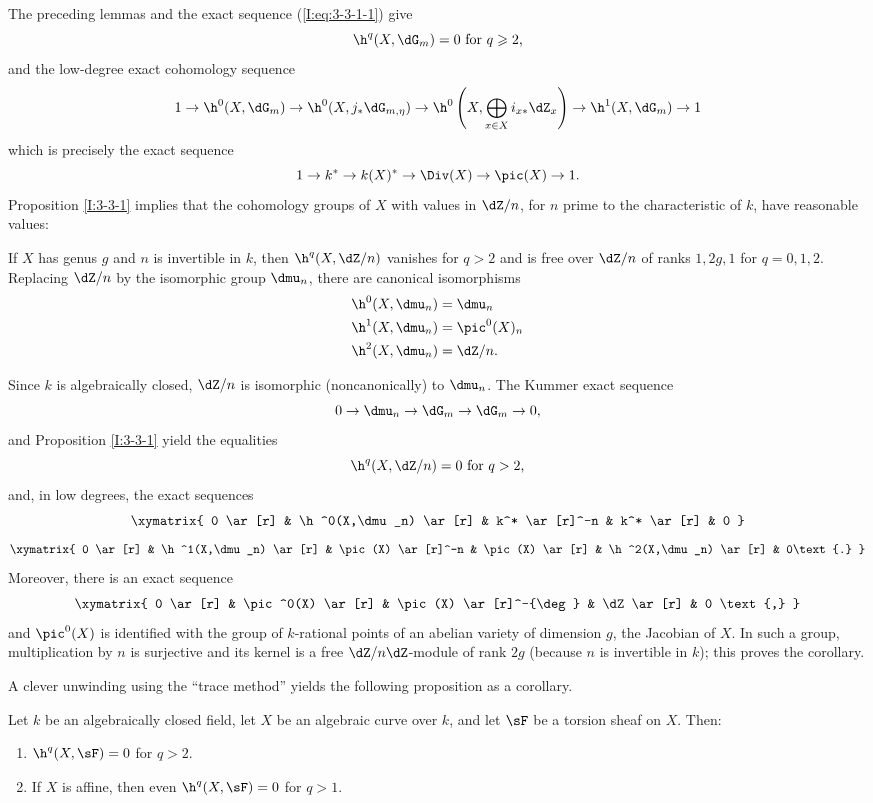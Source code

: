 The preceding lemmas and the exact sequence (\ref{I:eq:3-3-1-1}) give
\[
  \h^q(X,\dG_m) = 0 \text{ for $q\geqslant 2$,}
\]
and the low-degree exact cohomology sequence
\[
  1 \to \h^0(X,\dG_m) \to \h^0(X, j_*\dG_{m,\eta}) \to \h^0\left(X,\bigoplus_{x\in X} i_{x*}\dZ_x\right) \to \h^1(X,\dG_m) \to 1
\]
which is precisely the exact sequence
\[
  1 \to k^* \to k(X)^*\to \Div(X) \to \pic(X) \to 1\text{.}
\]
Proposition \ref{I:3-3-1} implies that the cohomology groups of $X$ with
values in $\dZ/n$, for $n$ prime to the characteristic of $k$, have
reasonable values:

\begin{corollary}\label{I:3-3-5}
If $X$ has genus $g$ and $n$ is invertible in $k$, then
$\h^q(X,\dZ/n)$ vanishes for $q>2$ and is free over $\dZ/n$ of ranks
$1,2g,1$ for $q=0,1,2$. Replacing $\dZ/n$ by the isomorphic group
$\dmu_n$, there are canonical isomorphisms
\begin{align*}
  \h^0(X,\dmu_n) &= \dmu_n \\
  \h^1(X,\dmu_n) &= \pic^0(X)_n \\
  \h^2(X,\dmu_n) &= \dZ/n \text{.}
\end{align*}
\end{corollary}

Since $k$ is algebraically closed, $\dZ/n$ is isomorphic
(noncanonically) to $\dmu_n$. The Kummer exact sequence
\[
  0 \to \dmu_n \to \dG_m \to \dG_m \to 0\text{,}
\]
and Proposition \ref{I:3-3-1} yield the equalities
\[
  \h^q(X,\dZ/n) = 0 \text{ for $q>2$,}
\]
and, in low degrees, the exact sequences
\[\xymatrix{
  0 \ar[r]
    & \h^0(X,\dmu_n) \ar[r]
    & k^* \ar[r]^-n
    & k^* \ar[r]
    & 0
}\]
\[\xymatrix{
  0 \ar[r]
    & \h^1(X,\dmu_n) \ar[r]
    & \pic(X) \ar[r]^-n & \pic(X) \ar[r] & \h^2(X,\dmu_n) \ar[r]
    & 0\text{.}
}\]
Moreover, there is an exact sequence
\[\xymatrix{
  0 \ar[r]
    & \pic^0(X) \ar[r]
    & \pic(X) \ar[r]^-{\deg}
    & \dZ \ar[r]
    & 0 \text{,}
}\]
and $\pic^0(X)$ is identified with the group of $k$-rational points of
an abelian variety of dimension $g$, the Jacobian of $X$. In such a
group, multiplication by $n$ is surjective and its kernel is a free
$\dZ/n\dZ$-module of rank $2g$ (because $n$ is invertible in $k$);
this proves the corollary.

A clever unwinding using the “trace method” yields the following
proposition as a corollary.

\begin{proposition}\label{I:3-3-6}
Let $k$ be an algebraically closed field, let $X$ be an algebraic curve
over $k$, and let $\sF$ be a torsion sheaf on $X$. Then:
\begin{enumerate}[\indent i)]
  \item $\h^q(X,\sF)=0$ for $q>2$.
  \item If $X$ is affine, then even $\h^q(X,\sF)=0$ for $q>1$.
\end{enumerate}
\end{proposition}

